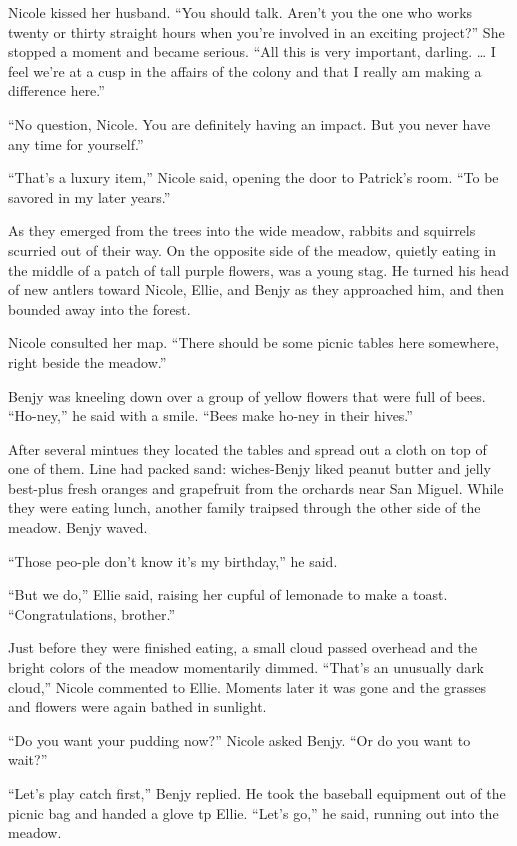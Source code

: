 \documentclass[]{article}
\begin{document}
{Nicole kissed her husband.  “You should talk.  Aren’t you the one who works twenty or thirty straight hours when you’re involved in an exciting project?” She stopped a moment and became serious.  “All this is very important, darling.  … I feel we’re at a cusp in the affairs of the colony and that I really am making a difference here.”

“No question, Nicole.  You are definitely having an impact.  But you never have any time for yourself.”

“That’s a luxury item,” Nicole said, opening the door to Patrick’s room.  “To be savored in my later years.”

As they emerged from the trees into the wide meadow, rabbits and squirrels scurried out of their way.  On the opposite side of the meadow, quietly eating in the middle of a patch of tall purple flowers, was a young stag.  He turned his head of new antlers toward Nicole, Ellie, and Benjy as they approached him, and then bounded away into the forest.

Nicole consulted her map.  “There should be some picnic tables here somewhere, right beside the meadow.”

Benjy was kneeling down over a group of yellow flowers that were full of bees.  “Ho-ney,” he said with a smile.  “Bees make ho-ney in their hives.”

After several mintues they located the tables and spread out a cloth on top of one of them.  Line had packed sand: wiches-Benjy liked peanut butter and jelly best-plus fresh oranges and grapefruit from the orchards near San Miguel.  While they were eating lunch, another family traipsed through the other side of the meadow.  Benjy waved.

“Those peo-ple don’t know it’s my birthday,” he said.

“But we do,” Ellie said, raising her cupful of lemonade to make a toast.  “Congratulations, brother.”

Just before they were finished eating, a small cloud passed overhead and the bright colors of the meadow momentarily dimmed.  “That’s an unusually dark cloud,” Nicole commented to Ellie.  Moments later it was gone and the grasses and flowers were again bathed in sunlight.

“Do you want your pudding now?” Nicole asked Benjy.  “Or do you want to wait?”

“Let’s play catch first,” Benjy replied.  He took the baseball equipment out of the picnic bag and handed a glove tp Ellie.  “Let’s go,” he said, running out into the meadow.

}
\end{document}
